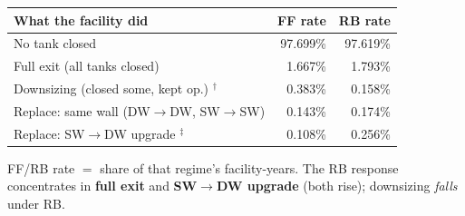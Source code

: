 \begin{center}
\small
\renewcommand{\arraystretch}{1.25}
\begin{tabular}{lrr}
\toprule
\textbf{What the facility did} & \textbf{FF rate} & \textbf{RB rate} \\
\midrule
No tank closed & 97.699\% & 97.619\% \\
Full exit (all tanks closed) & 1.667\% & 1.793\% \\
Downsizing (closed some, kept op.) $^{\dagger}$ & 0.383\% & 0.158\% \\
Replace: same wall (DW$\to$DW, SW$\to$SW) & 0.143\% & 0.174\% \\
Replace: SW$\to$DW upgrade $^{\ddagger}$ & 0.108\% & 0.256\% \\
\bottomrule
\end{tabular}
\end{center}
\vspace{0.1cm}
{\centering\scriptsize FF/RB rate $=$ share of that regime's facility-years. 
The RB response concentrates in \textbf{full exit} and \textbf{SW$\to$DW upgrade} (both rise); downsizing \emph{falls} under RB.\par}

